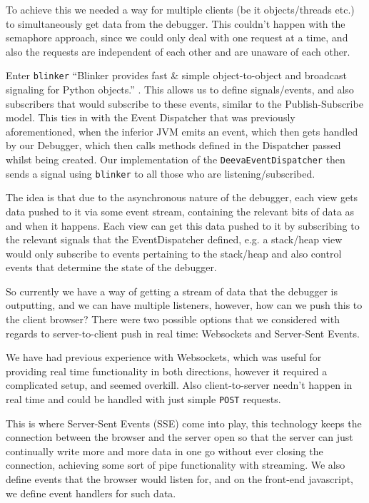\documentclass[11pt, a4paper]{article}
\begin{document}
To achieve this we needed a way for multiple clients (be it objects/threads
etc.) to simultaneously get data from the debugger. This couldn't happen with
the semaphore approach, since we could only deal with one request at a time, and
also the requests are independent of each other and are unaware of each other.

Enter \texttt{blinker} ``Blinker provides fast \& simple object-to-object and
broadcast signaling for Python objects.'' \cite{blinker}. This allows us to
define signals/events, and also subscribers that would subscribe to these
events, similar to the Publish-Subscribe model. This ties in with the Event
Dispatcher that was previously aforementioned, when the inferior JVM emits an
event, which then gets handled by our Debugger, which then calls methods defined
in the Dispatcher passed whilst being created. Our implementation of the
\texttt{DeevaEventDispatcher} then sends a signal using \texttt{blinker} to all
those who are listening/subscribed.

The idea is that due to the asynchronous nature of the debugger, each view gets
data pushed to it via some event stream, containing the relevant bits of data as
and when it happens. Each view can get this data pushed to it by subscribing to
the relevant signals that the EventDispatcher defined, e.g. a stack/heap view
would only subscribe to events pertaining to the stack/heap and also control
events that determine the state of the debugger.

So currently we have a way of getting a stream of data that the debugger is
outputting, and we can have multiple listeners, however, how can we push this to
the client browser? There were two possible options that we considered with
regards to server-to-client push in real time: Websockets and Server-Sent
Events.

We have had previous experience with Websockets, which was useful for providing
real time functionality in both directions, however it required a complicated
setup, and seemed overkill. Also client-to-server needn't happen in real time
and could be handled with just simple \texttt{POST} requests.

This is where Server-Sent Events (SSE) come into play, this technology keeps the
connection between the browser and the server open so that the server can just
continually write more and more data in one go without ever closing the
connection, achieving some sort of pipe functionality with streaming. We also
define events that the browser would listen for, and on the front-end
javascript, we define event handlers for such data.
\end{document}
